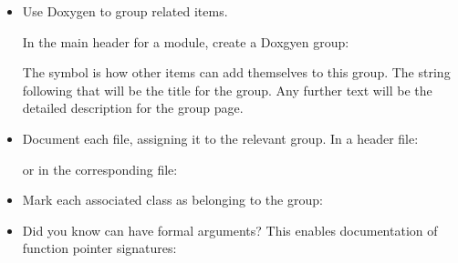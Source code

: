 \documentclass[letterpaper,10pt,english]{sphinxmanual}
\renewcommand{\sphinxcode}[1]{\texttt{\small{#1}}}
\begin{document}
\begin{itemize}
\item {} 
Use Doxygen \sphinxcode{} to group related items.

In the main header for a module, create a Doxgyen group:

\begin{sphinxVerbatim}[commandchars=\\\{\}]
\end{sphinxVerbatim}

The symbol \sphinxcode{} is how other items can add themselves to this group.
The string following that will be the title for the group.  Any further
text will be the detailed description for the group page.

\item {} 
Document each file, assigning it to the relevant group.  In a header file:

\begin{sphinxVerbatim}[commandchars=\\\{\}]
\end{sphinxVerbatim}

or in the corresponding \sphinxcode{} file:

\begin{sphinxVerbatim}[commandchars=\\\{\}]
\end{sphinxVerbatim}

\item {} 
Mark each associated class as belonging to the group:

\begin{sphinxVerbatim}[commandchars=\\\{\}]
 
\end{sphinxVerbatim}

\item {} 
Did you know \sphinxcode{} can have formal arguments?  This enables
documentation of function pointer signatures:


\end{itemize}
\end{document}
